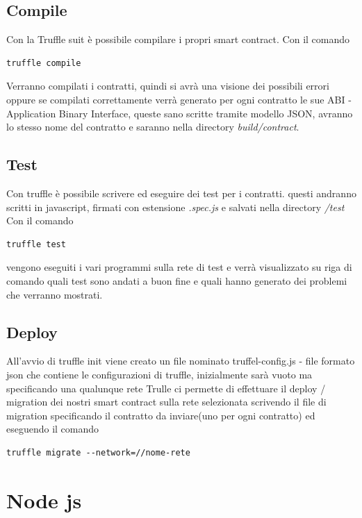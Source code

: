 \documentclass[12pt,titlepage]{report}
\begin{document}
\subsection{Compile}
Con la Truffle suit è possibile compilare i propri smart contract. Con il comando 
\begin{lstlisting}[language=command.com]
truffle compile
\end{lstlisting}
Verranno compilati i contratti, quindi si avrà una visione dei possibili errori oppure se compilati correttamente verrà generato per ogni contratto le sue ABI - Application Binary Interface, queste sano scritte tramite modello JSON, avranno lo stesso nome del contratto e saranno nella directory \textit{build/contract}.

\subsection{Test}
Con truffle è possibile scrivere ed eseguire dei test per i contratti. questi andranno scritti in javascript, firmati con estensione \textit{.spec.js} e salvati nella directory \textit{/test}
Con il comando
\begin{lstlisting}[language=command.com]
truffle test
\end{lstlisting}
vengono eseguiti i vari programmi sulla rete di test e verrà visualizzato su riga di comando quali test sono andati a buon fine e quali hanno generato dei problemi che verranno mostrati.

\subsection{Deploy}
All'avvio di truffle init viene creato un file nominato truffel-config.js - file formato json che contiene le configurazioni di truffle, inizialmente sarà vuoto ma specificando una qualunque rete Trulle ci permette di effettuare il deploy / migration dei nostri smart contract sulla rete selezionata scrivendo il file di migration specificando il contratto da inviare(uno per ogni contratto) ed eseguendo il comando
\begin{lstlisting}[language=command.com]
truffle migrate --network=//nome-rete
\end{lstlisting}

\section{Node js}
\end{document}
